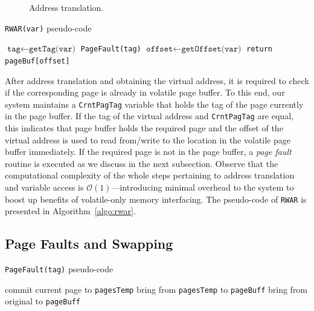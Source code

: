 \begin{figure}
	\centering
	\caption{Address translation.}
	\label{fig:address-translation}
\end{figure}

\begin{algorithm}[t]
	\caption{\texttt{RWAR(var)} pseudo-code}
	\label{algo:rwar}
	\scriptsize
	\begin{algorithmic}[1]
		\State $\texttt{tag}\leftarrow \texttt{getTag(var)}$ 
			
		\State	\texttt{PageFault(tag)} 
		\EndIf
				\State $\texttt{offset}\leftarrow \texttt{getOffset(var)}$ 		
		\State \texttt{return pageBuf[offset]}  
	\end{algorithmic}
\end{algorithm}

After address translation and obtaining the virtual address, it is required to check if the corresponding page is already in volatile page buffer. To this end, our system maintains a \texttt{CrntPagTag} variable that holds the tag of the page currently in the page buffer. If the tag of the virtual address and \texttt{CrntPagTag} are equal, this indicates that page buffer holds the required page and the offset of the virtual address is used to read from/write to the location in the volatile page buffer immediately. If the required page is not in the page buffer, a \emph{page fault} routine is executed as we discuss in the next subsection. Observe that the computational complexity of the whole steps pertaining to address translation and variable access is $\mathcal{O}(1)$---introducing minimal overhead to the system to boost up benefits of volatile-only memory interfacing. The pseudo-code of \texttt{RWAR} is presented in Algorithm~\ref{algo:rwar}.

\subsection{Page Faults and Swapping}


\begin{algorithm}[t]
	\caption{\texttt{PageFault(tag)} pseudo-code}
	\label{algo:pagefault}
	\scriptsize
	\begin{algorithmic}[1]
			
		\State commit current page to \texttt{pagesTemp}
		\EndIf
			
		\State bring from \texttt{pagesTemp} to \texttt{pageBuff} 
		\Else
		\State bring from original to \texttt{pageBuff} 
		\EndIf 
	\end{algorithmic}
\end{algorithm}

